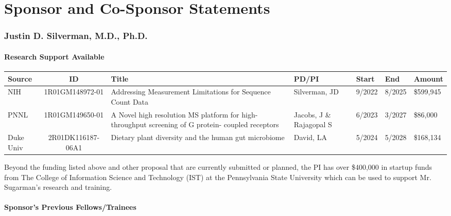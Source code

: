 \documentclass{NIHGrant}
\begin{document}
\thispagestyle{empty}

\part*{Sponsor and Co-Sponsor Statements}
\vspace{10pt}

\section*{Justin D. Silverman, M.D., Ph.D. }

\subsection*{Research Support Available}

\begin{center}
\renewcommand{\arraystretch}{1.3}
  \fontsize{9pt}{9pt}\selectfont
  \begin{tabular}{| p{0.5in} | c | p{1.5in} | p{1in} | p{0.5in} | p{0.5in} | p{0.7in} |}
    \hline 
    \textbf{Source} & \textbf{ID} & \textbf{Title} & \textbf{PD/PI} & \textbf{Start} & \textbf{End} & \textbf{Amount} \\
    \hline
    NIH & 1R01GM148972-01 & Addressing Measurement Limitations for Sequence Count Data &  Silverman, JD & 9/2022 & 8/2025 & \$599,945 \\
    \hline
    PNNL & 1R01GM149650-01 & A Novel high resolution MS platform for high-throughput screening of G protein- coupled receptors & Jacobs, J \& Rajagopal S & 6/2023 & 3/2027 & \$86,000 \\
    \hline 
    Duke Univ  & 2R01DK116187-06A1 & Dietary plant diversity and the human gut microbiome & David, LA & 5/2024 & 5/2028 & \$168,134 \\
    \hline
  \end{tabular}
\end{center}

Beyond the funding listed above and other proposal that are currently submitted
or planned, the PI has over \$400,000 in startup funds from The College of
Information Science and Technology (IST) at the Pennsylvania State University
which can be used to support Mr. Sugarman's research and training.

\subsection*{Sponsor's Previous Fellows/Trainees}
\end{document}
